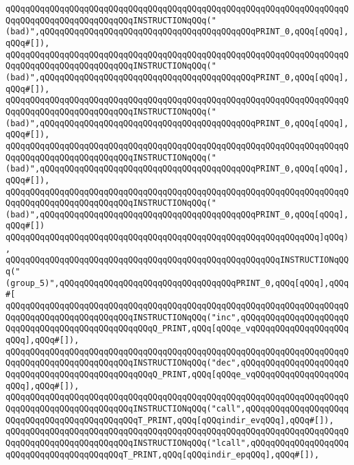 \verb|qQQqqQQqqQQqqQQqqQQqqQQqqQQqqQQqqQQqqQQqqQQqqQQqqQQqqQQqqQQqqQQqqQQqqQQqqQQqqQQqqQQqqQQqqQQqqQQqINSTRUCTIONqQQq("(bad)",qQQqqQQqqQQqqQQqqQQqqQQqqQQqqQQqqQQqqQQqqQQqPRINT_0,qQQq[qQQq],qQQq#[]),|\newline
\verb|qQQqqQQqqQQqqQQqqQQqqQQqqQQqqQQqqQQqqQQqqQQqqQQqqQQqqQQqqQQqqQQqqQQqqQQqqQQqqQQqqQQqqQQqqQQqqQQqINSTRUCTIONqQQq("(bad)",qQQqqQQqqQQqqQQqqQQqqQQqqQQqqQQqqQQqqQQqqQQqPRINT_0,qQQq[qQQq],qQQq#[]),|\newline
\verb|qQQqqQQqqQQqqQQqqQQqqQQqqQQqqQQqqQQqqQQqqQQqqQQqqQQqqQQqqQQqqQQqqQQqqQQqqQQqqQQqqQQqqQQqqQQqqQQqINSTRUCTIONqQQq("(bad)",qQQqqQQqqQQqqQQqqQQqqQQqqQQqqQQqqQQqqQQqqQQqPRINT_0,qQQq[qQQq],qQQq#[]),|\newline
\verb|qQQqqQQqqQQqqQQqqQQqqQQqqQQqqQQqqQQqqQQqqQQqqQQqqQQqqQQqqQQqqQQqqQQqqQQqqQQqqQQqqQQqqQQqqQQqqQQqINSTRUCTIONqQQq("(bad)",qQQqqQQqqQQqqQQqqQQqqQQqqQQqqQQqqQQqqQQqqQQqPRINT_0,qQQq[qQQq],qQQq#[]),|\newline
\verb|qQQqqQQqqQQqqQQqqQQqqQQqqQQqqQQqqQQqqQQqqQQqqQQqqQQqqQQqqQQqqQQqqQQqqQQqqQQqqQQqqQQqqQQqqQQqqQQqINSTRUCTIONqQQq("(bad)",qQQqqQQqqQQqqQQqqQQqqQQqqQQqqQQqqQQqqQQqqQQqPRINT_0,qQQq[qQQq],qQQq#[])|\newline
\verb|qQQqqQQqqQQqqQQqqQQqqQQqqQQqqQQqqQQqqQQqqQQqqQQqqQQqqQQqqQQqqQQq]qQQq),|\newline
\verb|qQQqqQQqqQQqqQQqqQQqqQQqqQQqqQQqqQQqqQQqqQQqqQQqqQQqqQQqINSTRUCTIONqQQq("(group_5)",qQQqqQQqqQQqqQQqqQQqqQQqqQQqqQQqqQQqPRINT_0,qQQq[qQQq],qQQq#[|\newline
\verb|qQQqqQQqqQQqqQQqqQQqqQQqqQQqqQQqqQQqqQQqqQQqqQQqqQQqqQQqqQQqqQQqqQQqqQQqqQQqqQQqqQQqqQQqqQQqqQQqINSTRUCTIONqQQq("inc",qQQqqQQqqQQqqQQqqQQqqQQqqQQqqQQqqQQqqQQqqQQqqQQqqQQqQ_PRINT,qQQq[qQQqe_vqQQqqQQqqQQqqQQqqQQqqQQq],qQQq#[]),|\newline
\verb|qQQqqQQqqQQqqQQqqQQqqQQqqQQqqQQqqQQqqQQqqQQqqQQqqQQqqQQqqQQqqQQqqQQqqQQqqQQqqQQqqQQqqQQqqQQqqQQqINSTRUCTIONqQQq("dec",qQQqqQQqqQQqqQQqqQQqqQQqqQQqqQQqqQQqqQQqqQQqqQQqqQQqQ_PRINT,qQQq[qQQqe_vqQQqqQQqqQQqqQQqqQQqqQQq],qQQq#[]),|\newline
\verb|qQQqqQQqqQQqqQQqqQQqqQQqqQQqqQQqqQQqqQQqqQQqqQQqqQQqqQQqqQQqqQQqqQQqqQQqqQQqqQQqqQQqqQQqqQQqqQQqINSTRUCTIONqQQq("call",qQQqqQQqqQQqqQQqqQQqqQQqqQQqqQQqqQQqqQQqqQQqqQQqT_PRINT,qQQq[qQQqindir_evqQQq],qQQq#[]),|\newline
\verb|qQQqqQQqqQQqqQQqqQQqqQQqqQQqqQQqqQQqqQQqqQQqqQQqqQQqqQQqqQQqqQQqqQQqqQQqqQQqqQQqqQQqqQQqqQQqqQQqINSTRUCTIONqQQq("lcall",qQQqqQQqqQQqqQQqqQQqqQQqqQQqqQQqqQQqqQQqqQQqT_PRINT,qQQq[qQQqindir_epqQQq],qQQq#[]),|\newline
